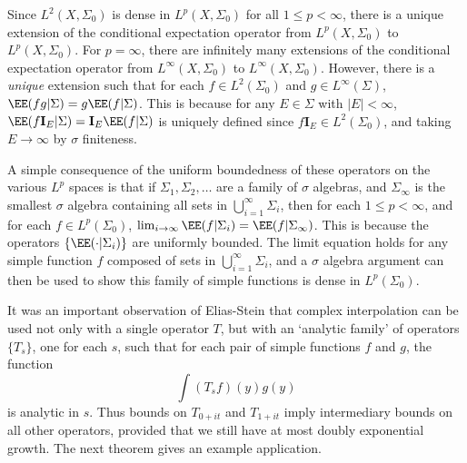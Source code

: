 \begin{example}
Since $L^2(X,\Sigma_0)$ is dense in $L^p(X,\Sigma_0)$ for all $1 \leq p < \infty$, there is a unique extension of the conditional expectation operator from $L^p(X,\Sigma_0)$ to $L^p(X,\Sigma_0)$. For $p = \infty$, there are infinitely many extensions of the conditional expectation operator from $L^\infty(X,\Sigma_0)$ to $L^\infty(X,\Sigma_0)$. However, there is a \emph{unique} extension such that for each $f \in L^2(\Sigma_0)$ and $g \in L^\infty(\Sigma)$, $\EE(fg|\Sigma) = g \EE(f|\Sigma)$. This is because for any $E \in \Sigma$ with $|E| < \infty$, $\EE(f \mathbf{I}_E | \Sigma) = \mathbf{I}_E \EE(f|\Sigma)$ is uniquely defined since $f \mathbf{I}_E \in L^2(\Sigma_0)$, and taking $E \to \infty$ by $\sigma$ finiteness.

A simple consequence of the uniform boundedness of these operators on the various $L^p$ spaces is that if $\Sigma_1, \Sigma_2, \dots$ are a family of $\sigma$ algebras, and $\Sigma_\infty$ is the smallest $\sigma$ algebra containing all sets in $\bigcup_{i = 1}^\infty \Sigma_i$, then for each $1 \leq p < \infty$, and for each $f \in L^p(\Sigma_0)$, $\lim_{i \to \infty} \EE(f|\Sigma_i) = \EE(f|\Sigma_\infty)$. This is because the operators $\{ \EE(\cdot|\Sigma_i) \}$ are uniformly bounded. The limit equation holds for any simple function $f$ composed of sets in $\bigcup_{i = 1}^\infty \Sigma_i$, and a $\sigma$ algebra argument can then be used to show this family of simple functions is dense in $L^p(\Sigma_0)$.
\end{example}

It was an important observation of Elias-Stein that complex interpolation can be used not only with a single operator $T$, but with an `analytic family' of operators $\{ T_s \}$, one for each $s$, such that for each pair of simple functions $f$ and $g$, the function
%
\[ \int (T_s f)(y) g(y) \]
%
is analytic in $s$. Thus bounds on $T_{0+it}$ and $T_{1 + it}$ imply intermediary bounds on all other operators, provided that we still have at most doubly exponential growth. The next theorem gives an example application.

